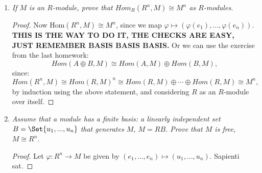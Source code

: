 \documentclass[9pt,reqno,twoside]{amsbook}
\theoremstyle{plain}
\numberwithin{section}{chapter}
\numberwithin{equation}{chapter}
\theoremstyle{definition}
\theoremstyle{remark}
\theoremstyle{plain}
\renewcommand{\phi}{\varphi}
\begin{document}
\begin{enumerate}[label=\arabic*.]
\begin{proof}
In the above expression, the first equality comes from the definition of addition in $H_A \times H_B$. The second and third equalities comes from the definition of $\Phi$. And we also know: 
$$
\Phi(r(\phi,\psi)) = \Phi((r\phi,r\psi)) = r\phi + r\psi = r(\phi + \psi) = r\Phi((\phi,\psi)),
$$
hence $\Phi$ preserves mult. by $R$, by the definition of scalar multiplication on the $R$-module $H_A \times H_B$, and the definition of $\Phi$. 

\textbf{Surjectivity: } Let $\phi \in H$. Then $\phi:A\times B \to M$. So let $\phi \in H_A$ be given by $\phi(a) = \phi(a,0)$,
and let $\psi \in H_B$ be given by $\phi(b) = \phi(0,b)$. Then we have: $\Phi((\phi,\psi)) = \phi$.  Then $\Phi$ is surjective. 


\textbf{Injectivity: } Let $\Phi((\phi_1,\psi_1)) = \phi_1 + \psi_1 = \phi_2 + \psi_2 = \Phi((\phi_2,\psi_2)) \in H_A \times H_B$. Then note that 
$$
(\phi_1 + \psi_1)(a,0) = \phi_1(a) = \phi_2(a) = (\phi_2 + \psi_2)(a,0),
$$
and the same holds when we let $a = 0$, and use an arbitrary $b$ value, so we get that $\psi_1 = \psi_2$ as well. Hence $\Phi$ is injective. And thus it is an isomorphism. 
\end{proof}

\item \textit{If $M$ is an $R$-module, prove that $Hom_R(R^n,M) \cong M^n$ as $R$-modules. }

\begin{proof}


Now Hom$(R^n,M) \cong M^n$, since we map $\phi \mapsto (\phi(e_1),...,\phi(e_n))$. \textbf{THIS IS THE WAY TO DO IT, THE CHECKS ARE EASY, JUST REMEMBER BASIS BASIS BASIS. }Or we can use the exercise from the last homework:
$$
Hom(A \oplus B,M) \cong Hom(A,M) \oplus Hom(B,M),
$$
since:
$$
Hom(R^n,M) \cong Hom(R,M)^n \cong  Hom(R,M) \oplus \cdots \oplus Hom(R,M) \cong M^n,
$$
by induction using the above statement, and considering $R$ as an $R$-module over itself. 
\end{proof}

\item \textit{Assume that a module has a finite basis: a linearly independent set $B = \Set{u_1,...,u_n}$ that generates $M$, $M = RB$. Prove that $M$ is free, $M \cong R^n$. }\label{B.8}

\begin{proof}
Let $\phi:R^n \to M$ be given by $(e_1,...,e_n) \mapsto (u_1,...,u_n)$. Sapienti sat. 
\end{proof}


\end{enumerate}
\end{document}
